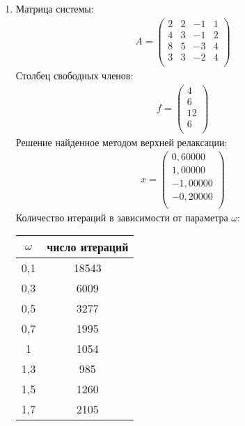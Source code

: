 \documentclass[a4paper,12pt,titlepage,finall]{article}
\begin{document}
\begin{enumerate}
\item
Матрица системы:
\begin{align*}
A = \begin{pmatrix}
2&  2&  -1&  1 \\
4&  3&  -1&  2 \\
8&  5&  -3&  4 \\
3&  3&  -2&  4 \\
\end{pmatrix}
\end{align*}
Столбец свободных членов:
\begin{align*}
f = \begin{pmatrix}
4 \\
6 \\
12 \\
6 \\
\end{pmatrix}
\end{align*}
Решение найденное методом верхней релаксации:
\begin{align*}
x = \begin{pmatrix}
0,60000 \\
   1,00000 \\
  -1,00000 \\
  -0,20000 \\
\end{pmatrix}
\end{align*}
Количество итераций в зависимости от параметра $\omega$:
\begin{center}
\begin{tabular}{|c|c|}
\hline
$\omega$ & число итераций\\
\hline
0,1 & 18543\\
0,3 & 6009\\
0,5 & 3277\\
0,7 & 1995\\
 1 & 1054\\
 1,3 & 985\\
 1,5 & 1260\\
 1,7 & 2105\\
 \hline
\end{tabular}
\end{center}


\end{enumerate}
\end{document}
